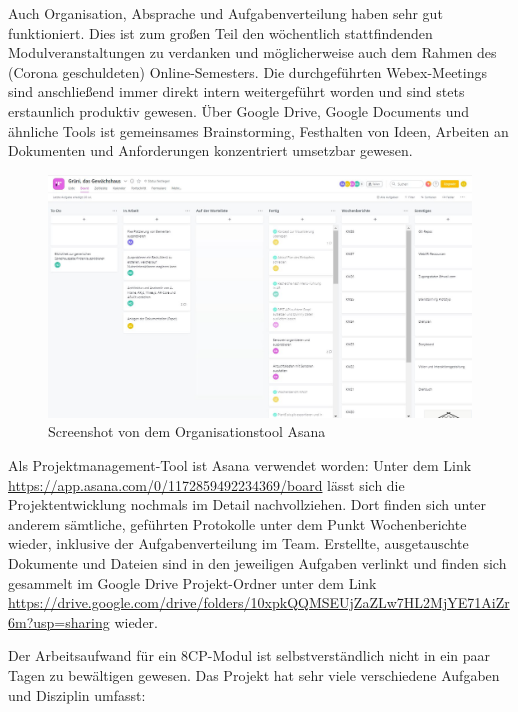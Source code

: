 Auch Organisation, Absprache und Aufgabenverteilung haben sehr gut
funktioniert. Dies ist zum großen Teil den wöchentlich stattfindenden
Modulveranstaltungen zu verdanken und möglicherweise auch dem Rahmen des
(Corona geschuldeten) Online-Semesters. Die durchgeführten
Webex-Meetings sind anschließend immer direkt intern weitergeführt
worden und sind stets erstaunlich produktiv gewesen. Über Google Drive,
Google Documents und ähnliche Tools ist gemeinsames Brainstorming,
Festhalten von Ideen, Arbeiten an Dokumenten und Anforderungen
konzentriert umsetzbar gewesen.

\begin{figure}
\centering
\includegraphics{img/asana.JPG}
\caption{Screenshot von dem Organisationstool Asana}
\end{figure}

Als Projektmanagement-Tool ist Asana verwendet worden: Unter dem Link
\url{https://app.asana.com/0/1172859492234369/board} lässt sich die
Projektentwicklung nochmals im Detail nachvollziehen. Dort finden sich
unter anderem sämtliche, geführten Protokolle unter dem Punkt
Wochenberichte wieder, inklusive der Aufgabenverteilung im Team.
Erstellte, ausgetauschte Dokumente und Dateien sind in den jeweiligen
Aufgaben verlinkt und finden sich gesammelt im Google Drive
Projekt-Ordner unter dem Link
\url{https://drive.google.com/drive/folders/10xpkQQMSEUjZaZLw7HL2MjYE71AiZr6m?usp=sharing}
wieder.

Der Arbeitsaufwand für ein 8CP-Modul ist selbstverständlich nicht in ein
paar Tagen zu bewältigen gewesen. Das Projekt hat sehr viele
verschiedene Aufgaben und Disziplin umfasst:

